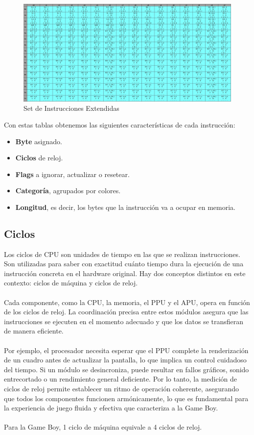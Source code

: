 \begin{figure}[H]
\centering
\includegraphics[width=1\textwidth]{include/images/opcodes_2.jpg}
\caption{Set de Instrucciones Extendidas}
\label{figure:opcodes_2}
\end{figure}

Con estas tablas obtenemos las siguientes características de cada instrucción:
\begin{itemize}
    \item \textbf{Byte} asignado.
    \item \textbf{Ciclos} de reloj.
    \item \textbf{Flags} a ignorar, actualizar o resetear.
    \item \textbf{Categoría}, agrupados por colores.
    \item \textbf{Longitud}, es decir, los bytes que la instrucción va a ocupar en memoria.
\end{itemize}

\subsection{Ciclos}

Los ciclos de CPU son unidades de tiempo en las que se realizan instrucciones. Son utilizadas para saber con exactitud cuánto tiempo dura la ejecución de una instrucción concreta en el hardware original. Hay dos conceptos distintos en este contexto: ciclos de máquina y ciclos de reloj.
\\\\
Cada componente, como la CPU, la memoria, el PPU y el APU, opera en función de los ciclos de reloj. La coordinación precisa entre estos módulos asegura que las instrucciones se ejecuten en el momento adecuado y que los datos se transfieran de manera eficiente.
\\\\
Por ejemplo, el procesador necesita esperar que el PPU complete la renderización de un cuadro antes de actualizar la pantalla, lo que implica un control cuidadoso del tiempo. Si un módulo se desincroniza, puede resultar en fallos gráficos, sonido entrecortado o un rendimiento general deficiente. Por lo tanto, la medición de ciclos de reloj permite establecer un ritmo de operación coherente, asegurando que todos los componentes funcionen armónicamente, lo que es fundamental para la experiencia de juego fluida y efectiva que caracteriza a la Game Boy.
\\\\
Para la Game Boy, 1 ciclo de máquina equivale a 4 ciclos de reloj.

